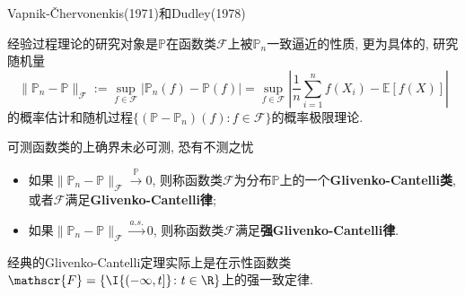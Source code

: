 Vapnik-Čhervonenkis(1971)和Dudley(1978)

经验过程理论的研究对象是$\mathbb{P}$在函数类$\mathscr{F}$上被$\mathbb{P}_n$一致逼近的性质, 更为具体的, 研究随机量 
\begin{equation*}
	\|\mathbb{P}_n - \mathbb{P}\|_{\mathscr{F}} 
	:= \sup_{f \in\mathscr{F}} \left| \mathbb{P}_n(f) - \mathbb{P}(f) \right|
	= \sup_{f \in\mathscr{F}} \left| \frac{1}{n} \sum_{i=1}^n f(X_i) - \mathbb{E}[f(X)] \right|
\end{equation*}
的概率估计和随机过程$\{(\mathbb{P} - \mathbb{P}_n)(f) \colon f \in \mathscr{F}\}$的概率极限理论. 

可测函数类的上确界未必可测, 恐有不测之忧

\begin{itemize}
	\item 如果$\|\mathbb{P}_n - \mathbb{P}\|_{\mathscr{F}} \stackrel{\mathbb{P}}{\to} 0$, 则称函数类$\mathscr{F}$为分布$\mathbb{P}$上的一个\textbf{Glivenko-Cantelli类}, 或者$\mathscr{F}$满足\textbf{Glivenko-Cantelli律}; 
	\item 如果$\|\mathbb{P}_n - \mathbb{P}\|_{\mathscr{F}} \stackrel{a.s.}{\to} 0$, 则称函数类$\mathscr{F}$满足\textbf{强Glivenko-Cantelli律}. 
\end{itemize}
经典的Glivenko-Cantelli定理实际上是在示性函数类$\mathscr{F} = \{\I{(- \infty, t]} \colon t \in \R \}$上的强一致定律. 


